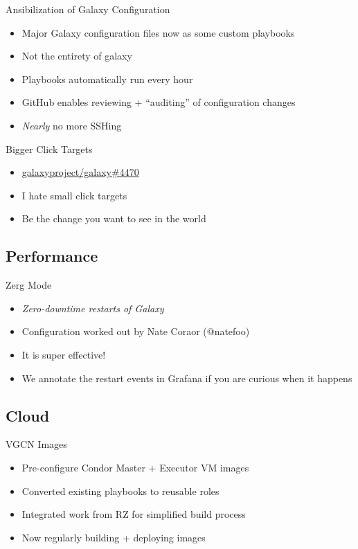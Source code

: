 \documentclass[12pt]{ufrslides}
\newcommand{\ghpr}[3]{\href{https://github.com/#1/#2/pull/#3}{#1/#2\##3}}
\begin{document}
	\begin{frame}{Ansibilization of Galaxy Configuration}
		\begin{itemize}
			\item Major Galaxy configuration files now as some custom playbooks
			\item Not the entirety of galaxy
			\item Playbooks automatically run every hour
			\item GitHub enables reviewing + ``auditing'' of configuration changes
			\item \emph{Nearly} no more SSHing
		\end{itemize}
	\end{frame}

	\begin{frame}{Bigger Click Targets}
		\begin{itemize}
			\item \ghpr{galaxyproject}{galaxy}{4470}
			\item I hate small click targets
			\item Be the change you want to see in the world
		\end{itemize}
	\end{frame}

\subsection{Performance}
	\begin{frame}{Zerg Mode}
		\begin{itemize}
			\item \emph{Zero-downtime restarts of Galaxy}
			\item Configuration worked out by Nate Coraor (@natefoo)
			\item It is super effective!
			\item We annotate the restart events in Grafana if you are curious when it happens
		\end{itemize}
	\end{frame}

\subsection{Cloud}
	\begin{frame}{VGCN Images}
		\begin{itemize}
			\item Pre-configure Condor Master + Executor VM images
			\item Converted existing playbooks to reusable roles
			\item Integrated work from RZ for simplified build process
			\item Now regularly building + deploying images
		\end{itemize}
	\end{frame}
\end{document}
